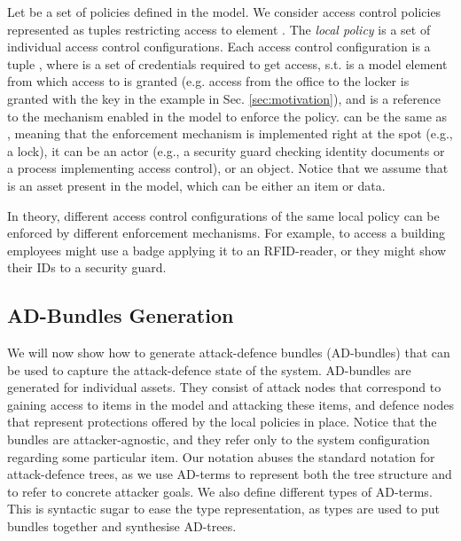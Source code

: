 \documentclass{llncs}
\begin{document}
Let  be a set of policies defined in the model. We consider access control policies represented as tuples restricting access to element . The \emph{local policy}  is a set of individual access control configurations. Each access control configuration  is a tuple , where  is a set of credentials required to get access,  s.t.  is a model element from which access to  is granted (e.g. access from the office to the locker is granted with the key in the example in Sec. \ref{sec:motivation}), and  is a reference to the mechanism enabled in the model to enforce the policy.  can be the same as , meaning that the enforcement mechanism is implemented right at the spot (e.g., a lock), it can be an actor (e.g., a security guard checking identity documents or a process implementing access control), or an object. Notice that we assume that  is an asset present in the model, which can be either an item or data. 

In theory, different access control configurations of the same local policy  can be enforced by different enforcement mechanisms. For example, to access a building employees might use a badge applying it to an RFID-reader, or they might show their IDs to a security guard. 


\subsection{AD-Bundles Generation}\label{subsec:generation}






We will now show how to generate attack-defence bundles (AD-bundles) that can be used to capture the attack-defence state of the system.
AD-bundles are generated for individual assets. They consist of attack nodes that correspond to gaining access to items in the model and attacking these items, and defence nodes that represent protections offered by the local policies in place. Notice that the bundles are attacker-agnostic, and they refer only to the system configuration regarding some particular item. Our notation abuses the standard notation for attack-defence trees, as we use AD-terms to represent both the tree structure and to refer to concrete attacker goals. We also define different types of AD-terms. This is syntactic sugar to ease the type representation, as types are used to put bundles together and synthesise AD-trees.
\end{document}
